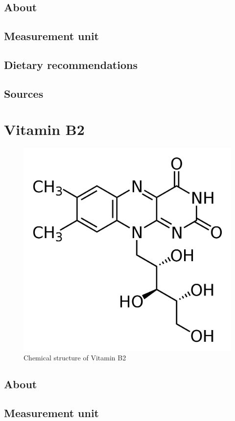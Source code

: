 \documentclass{book}
\begin{document}
\section{About}


\section{Measurement unit}


\section{Dietary recommendations}


\section{Sources}


\chapter{Vitamin B2}
\begin{figure}[h]
	\centering \includegraphics[width=0.75\linewidth]{images/Vitamin_B2_chemical_structure}
	\caption{Chemical structure of Vitamin B2}
\end{figure}

\section{About}


\section{Measurement unit}
\end{document}
